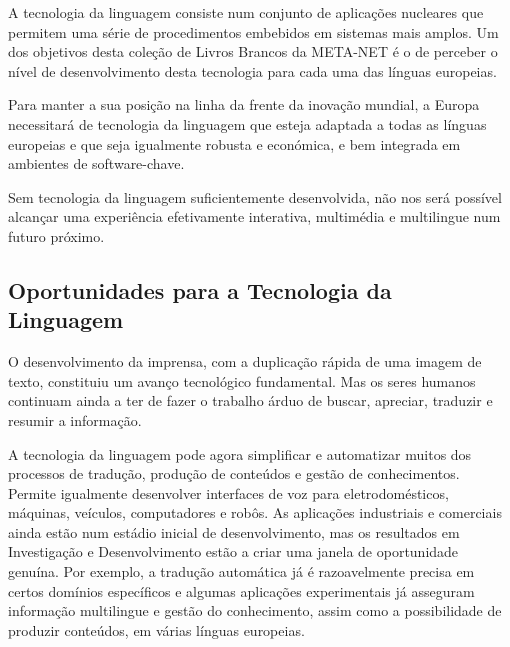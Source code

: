 \begin{multicols}{2}
A tecnologia da linguagem consiste num conjunto de aplicações nucleares que permitem uma série de procedimentos
embebidos em sistemas mais amplos. Um dos objetivos desta coleção de Livros Brancos da META-NET é o de perceber 
o nível de desenvolvimento desta tecnologia para cada uma das línguas europeias.


Para manter a sua posição na linha da frente da inovação mundial, a Europa necessitará de tecnologia da linguagem que esteja 
adaptada a todas as línguas europeias e que seja igualmente robusta e económica, e bem integrada em ambientes de software-chave.

Sem tecnologia da linguagem suficientemente desenvolvida, não nos será possível alcançar uma experiência efetivamente 
interativa, multimédia e multilingue num futuro próximo.

\subsection{Oportunidades para a Tecnologia da Linguagem}

O desenvolvimento da imprensa, com a duplicação rápida de uma imagem de texto, constituiu um avanço tecnológico fundamental. 
Mas os seres humanos continuam ainda a ter de fazer o trabalho árduo de buscar, apreciar, traduzir e resumir a informação. 

A tecnologia da linguagem pode agora simplificar e automatizar muitos dos processos de tradução, produção de conteúdos e gestão de conhecimentos. Permite igualmente desenvolver interfaces de voz para eletrodomésticos, máquinas, veículos, computadores e robôs. 
As aplicações industriais e comerciais ainda estão num estádio inicial de desenvolvimento, mas os resultados em Investigação e Desenvolvimento estão 
a criar uma janela de oportunidade genuína. Por exemplo, a tradução automática já é razoavelmente precisa em certos domínios específicos e algumas aplicações experimentais já asseguram informação multilingue e gestão do conhecimento, assim como a possibilidade de produzir conteúdos, em várias línguas europeias.


\end{multicols}
